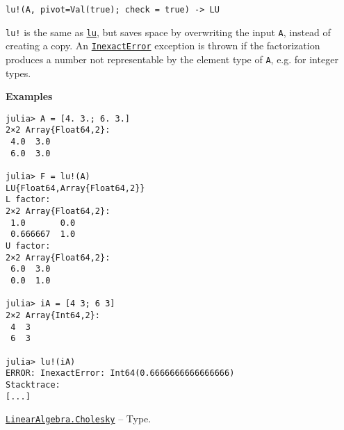 \begin{adjustwidth}{2em}{0pt}


\begin{verbatim}
lu!(A, pivot=Val(true); check = true) -> LU
\end{verbatim}

\texttt{lu!} is the same as \hyperlink{5672569096214810830}{\texttt{lu}}, but saves space by overwriting the input \texttt{A}, instead of creating a copy. An \hyperlink{5399118524830636312}{\texttt{InexactError}} exception is thrown if the factorization produces a number not representable by the element type of \texttt{A}, e.g. for integer types.

\textbf{Examples}


\begin{verbatim}
julia> A = [4. 3.; 6. 3.]
2×2 Array{Float64,2}:
 4.0  3.0
 6.0  3.0

julia> F = lu!(A)
LU{Float64,Array{Float64,2}}
L factor:
2×2 Array{Float64,2}:
 1.0       0.0
 0.666667  1.0
U factor:
2×2 Array{Float64,2}:
 6.0  3.0
 0.0  1.0

julia> iA = [4 3; 6 3]
2×2 Array{Int64,2}:
 4  3
 6  3

julia> lu!(iA)
ERROR: InexactError: Int64(0.6666666666666666)
Stacktrace:
[...]
\end{verbatim}



\end{adjustwidth}
\hypertarget{17457903574632305101}{} 
\hyperlink{17457903574632305101}{\texttt{LinearAlgebra.Cholesky}}  -- {Type.}

